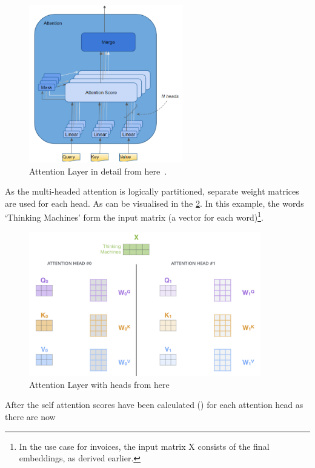 \begin{figure}[H]
	\centering
	\includegraphics[width=0.6\textwidth]{figures/attention_layer.png}
	\caption{Attention Layer in detail from here~\autocite{doshiTransformersExplainedVisually2021b}.}
	\label{fig:attention_layer}
\end{figure}
As the multi-headed attention is logically partitioned, separate weight matrices are used for each head. As can be visualised in the
\cref{fig:attention_layer_heads}. In this example, the words `Thinking Machines' form the input matrix (a vector for each word)\footnote{
	In the use case for invoices, the input matrix X consists of the final embeddings, as derived earlier.}.
\begin{figure}[H]
	\centering
	\includegraphics[width=0.9\textwidth]{figures/attention_multi_head.png}
	\caption{Attention Layer with heads from here~\autocite{alammarIllustratedTransformer}}
	\label{fig:attention_layer_heads}
\end{figure}
After the self attention scores have been calculated () for each attention head as there are now
